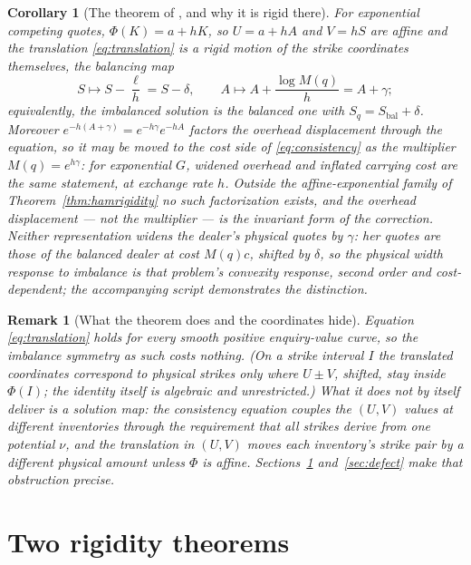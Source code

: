\documentclass[11pt]{article}
\newtheorem{corollary}{Corollary}
\newtheorem{remark}{Remark}
\begin{document}
\begin{corollary}[The theorem of \citet{cotton2026skew}, and why it is rigid there]\label{cor:steadystate}
For exponential competing quotes, $\Phi(K) = a + hK$, so $U = a + hA$ and $V = hS$ are affine and the translation \eqref{eq:translation} is a rigid motion of the strike coordinates themselves, the balancing map
\[
S \longmapsto S - \frac{\ell}{h} = S - \delta, \qquad
A \longmapsto A + \frac{\log M(q)}{h} = A + \gamma ;
\]
equivalently, the imbalanced solution is the balanced one with $S_q = S_{\mathrm{bal}} + \delta$.
Moreover $e^{-h(A+\gamma)} = e^{-h\gamma} e^{-hA}$ factors the overhead displacement through the equation, so it may be moved to the cost side of \eqref{eq:consistency} as the multiplier $M(q) = e^{h\gamma}$: for exponential $G$, widened overhead and inflated carrying cost are the same statement, at exchange rate $h$. Outside the affine-exponential family of Theorem~\ref{thm:hamrigidity} no such factorization exists, and the overhead displacement --- not the multiplier --- is the invariant form of the correction. Neither representation widens the dealer's physical quotes by $\gamma$: her quotes are those of the balanced dealer at cost $M(q)c$, shifted by $\delta$, so the physical width response to imbalance is that problem's convexity response, second order and cost-dependent; the accompanying script demonstrates the distinction.
\end{corollary}

\begin{remark}[What the theorem does and the coordinates hide]
Equation \eqref{eq:translation} holds for every smooth positive enquiry-value curve, so the imbalance symmetry as such costs nothing. (On a strike interval $I$ the translated coordinates correspond to physical strikes only where $U \pm V$, shifted, stay inside $\Phi(I)$; the identity itself is algebraic and unrestricted.) What it does not by itself deliver is a solution map: the consistency equation couples the $(U,V)$ values at different inventories through the requirement that all strikes derive from one potential $\nu$, and the translation in $(U,V)$ moves each inventory's strike pair by a different physical amount unless $\Phi$ is affine. Sections~\ref{sec:rigidity} and~\ref{sec:defect} make that obstruction precise.
\end{remark}

\section{Two rigidity theorems}\label{sec:rigidity}
\end{document}
